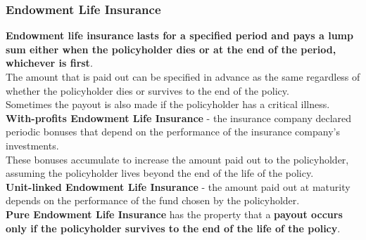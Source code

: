 \subsubsection{Endowment Life Insurance}
\textbf{\color{blue}Endowment life insurance} \textbf{\color{Mahogany}lasts for a specified period and pays a lump sum either when the policyholder dies or at the end of the period, whichever is first}.\\
The amount that is paid out can be specified in advance as the same regardless of whether the policyholder dies or survives to the end of the policy.\\
Sometimes the payout is also made if the policyholder has a critical illness.\\

\textbf{\color{blue}With-profits Endowment Life Insurance} - the insurance company declared periodic bonuses that depend on the performance of the insurance company's investments.\\
These bonuses accumulate to increase the amount paid out to the policyholder, assuming the policyholder lives beyond the end of the life of the policy.\\

\textbf{\color{blue}Unit-linked Endowment Life Insurance} - the amount paid out at maturity depends on the performance of the fund chosen by the policyholder.\\

\textbf{\color{blue}Pure Endowment Life Insurance} has the property that a \textbf{\color{Mahogany}payout occurs only if the policyholder survives to the end of the life of the policy}.
 

